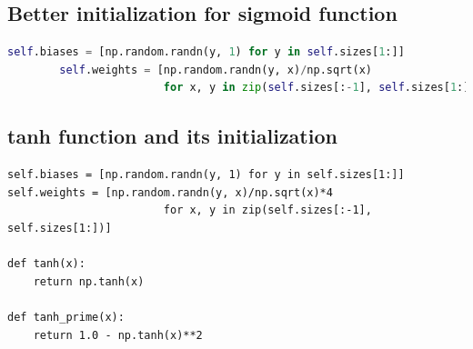 \documentclass[12pt,a4paper]{article}
\begin{document}
\subsection{Better initialization for sigmoid function}
\begin{lstlisting}[language=Python]
 self.biases = [np.random.randn(y, 1) for y in self.sizes[1:]]
        self.weights = [np.random.randn(y, x)/np.sqrt(x)
                        for x, y in zip(self.sizes[:-1], self.sizes[1:])]
\end{lstlisting}

\subsection{tanh function and its initialization}
\begin{lstlisting}
self.biases = [np.random.randn(y, 1) for y in self.sizes[1:]]
self.weights = [np.random.randn(y, x)/np.sqrt(x)*4
                        for x, y in zip(self.sizes[:-1], self.sizes[1:])]

def tanh(x):
    return np.tanh(x)

def tanh_prime(x):
    return 1.0 - np.tanh(x)**2
\end{lstlisting}
\end{document}
